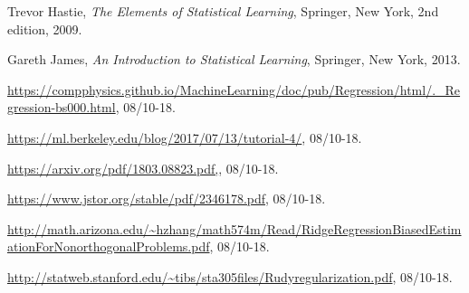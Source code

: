 \documentclass[a4paper,12pt, english]{article}
\begin{document}
\begin{thebibliography}{9}

  Trevor Hastie,
  \textit{The Elements of Statistical Learning},
  Springer, New York,
  2nd edition,
  2009.

  Gareth James, 
  \textit{An Introduction to Statistical Learning},
  Springer, New York,
  2013.
  
  \url{https://compphysics.github.io/MachineLearning/doc/pub/Regression/html/._Regression-bs000.html}, 08/10-18.
  
  \url{https://ml.berkeley.edu/blog/2017/07/13/tutorial-4/}, 08/10-18.
  
  \url{https://arxiv.org/pdf/1803.08823.pdf,}, 08/10-18.
  
  \url{https://www.jstor.org/stable/pdf/2346178.pdf}, 08/10-18.
 
  \url{http://math.arizona.edu/~hzhang/math574m/Read/RidgeRegressionBiasedEstimationForNonorthogonalProblems.pdf}, 08/10-18.
  
  \url{http://statweb.stanford.edu/~tibs/sta305files/Rudyregularization.pdf}, 08/10-18.
  

\end{thebibliography}
\end{document}
